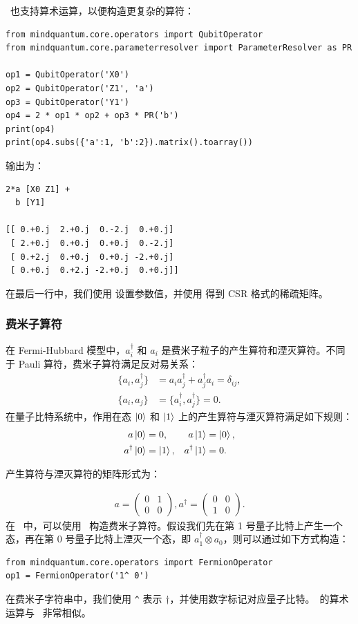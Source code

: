 \QubitOperator\ 也支持算术运算，以便构造更复杂的算符：

\begin{lstlisting}
from mindquantum.core.operators import QubitOperator
from mindquantum.core.parameterresolver import ParameterResolver as PR

op1 = QubitOperator('X0')
op2 = QubitOperator('Z1', 'a')
op3 = QubitOperator('Y1')
op4 = 2 * op1 * op2 + op3 * PR('b')
print(op4)
print(op4.subs({'a':1, 'b':2}).matrix().toarray())
\end{lstlisting}
输出为：
\begin{lstlisting}
2*a [X0 Z1] +
  b [Y1]

[[ 0.+0.j  2.+0.j  0.-2.j  0.+0.j]
 [ 2.+0.j  0.+0.j  0.+0.j  0.-2.j]
 [ 0.+2.j  0.+0.j  0.+0.j -2.+0.j]
 [ 0.+0.j  0.+2.j -2.+0.j  0.+0.j]]
\end{lstlisting}
在最后一行中，我们使用  设置参数值，并使用  得到 CSR 格式的稀疏矩阵。

\subsubsection{费米子算符}

在 Fermi-Hubbard 模型中，$a_i^\dagger$ 和 $a_i$ 是费米子粒子的产生算符和湮灭算符。不同于 Pauli 算符，费米子算符满足反对易关系：
\begin{align*}
    \{a_i, a_j^\dagger\} & = a_ia_j^\dagger + a_j^\dagger a_i = \delta_{ij}, \\
    \{a_i, a_j\}         & = \{a_i^\dagger, a_j^\dagger\}=0.
\end{align*}
在量子比特系统中，作用在态 $\ket{0}$ 和 $\ket{1}$ 上的产生算符与湮灭算符满足如下规则：
\begin{align*}
    a\ket{0}          & =0,        & a\ket{1}          & =\ket{0}, \\
    a^\dagger \ket{0} & = \ket{1}, & a^\dagger \ket{1} & =0.
\end{align*}

产生算符与湮灭算符的矩阵形式为：

\begin{align*}
    a=\begin{pmatrix}
        0 & 1 \\
        0 & 0
    \end{pmatrix},
    a^\dagger=\begin{pmatrix}
        0 & 0 \\
        1 & 0
    \end{pmatrix}.
\end{align*}
在 \MindQuantum\ 中，可以使用 \FermionOperator\ 构造费米子算符。假设我们先在第 1 号量子比特上产生一个态，再在第 0 号量子比特上湮灭一个态，即 $a_1^\dagger\otimes a_0$，则可以通过如下方式构造：
\begin{lstlisting}
from mindquantum.core.operators import FermionOperator
op1 = FermionOperator('1^ 0')
\end{lstlisting}
在费米子字符串中，我们使用 \verb|^| 表示 $\dagger$，并使用数字标记对应量子比特。\FermionOperator\ 的算术运算与 \QubitOperator\ 非常相似。



